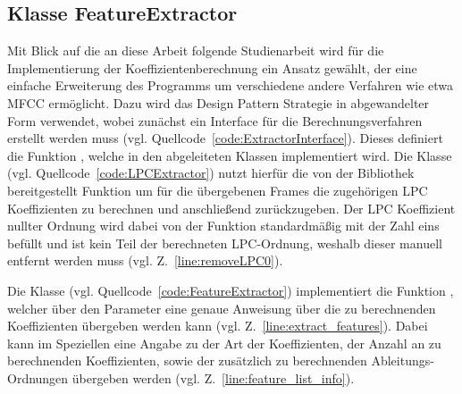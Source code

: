 \subsection{Klasse FeatureExtractor}
Mit Blick auf die an diese Arbeit folgende Studienarbeit wird für die Implementierung der Koeffizientenberechnung ein Ansatz gewählt, der eine einfache Erweiterung des Programms um verschiedene andere Verfahren wie etwa \ac{MFCC} ermöglicht.
Dazu wird das Design Pattern Strategie in abgewandelter Form verwendet, wobei zunächst ein Interface für die Berechnungsverfahren erstellt werden muss (vgl. Quellcode~\ref{code:ExtractorInterface}).
Dieses definiert die Funktion , welche in den abgeleiteten Klassen implementiert wird.
Die Klasse  (vgl. Quellcode~\ref{code:LPCExtractor}) nutzt hierfür die von der Bibliothek  bereitgestellt Funktion  um für die übergebenen Frames die zugehörigen \ac{LPC} Koeffizienten zu berechnen und anschließend zurückzugeben.
Der \ac{LPC} Koeffizient nullter Ordnung wird dabei von der Funktion standardmäßig mit der Zahl eins befüllt und ist kein Teil der berechneten \ac{LPC}-Ordnung, weshalb dieser manuell entfernt werden muss (vgl. Z.~\ref{line:removeLPC0}).

Die Klasse  (vgl. Quellcode~\ref{code:FeatureExtractor}) implementiert die Funktion , welcher über den Parameter  eine genaue Anweisung über die zu berechnenden Koeffizienten übergeben werden kann (vgl. Z.~\ref{line:extract_features}).
Dabei kann im Speziellen eine Angabe zu der Art der Koeffizienten, der Anzahl an zu berechnenden Koeffizienten, sowie der zusätzlich zu berechnenden Ableitungs-Ordnungen übergeben werden (vgl. Z.~\ref{line:feature_list_info}).